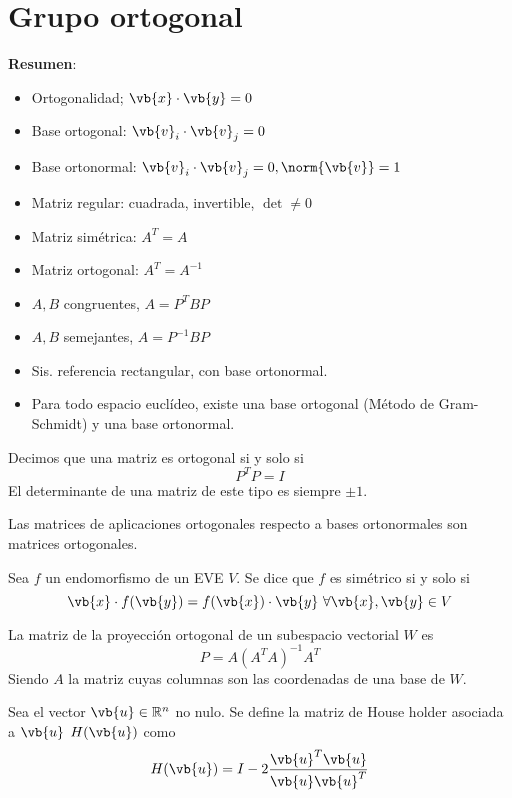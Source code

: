 \documentclass{./Geometria.tex}
\begin{document}
\chapter{Grupo ortogonal}
\textbf{Resumen}:
\begin{itemize}
    \item Ortogonalidad; \(\vb{x} \cdot \vb{y} = 0\)
    \item Base ortogonal: \(\vb{v}_i \cdot \vb{v}_j = 0\)
    \item Base ortonormal: \(\vb{v}_i \cdot \vb{v}_j = 0, \norm{\vb{v}} = 1\)
    \item Matriz regular: cuadrada, invertible, \(\det \neq 0\)
    \item Matriz simétrica: \(A^{T} = A\)
    \item Matriz ortogonal: \(A^{T} = A^{-1}\)
    \item \(A,B\) congruentes, \(A = P^{T}BP\)
    \item \(A,B\) semejantes, \(A = P^{-1}BP\)
    \item Sis. referencia rectangular, con base ortonormal.
    \item Para todo espacio euclídeo, existe una base ortogonal (Método de Gram-Schmidt) y una base ortonormal.
\end{itemize}
\begin{defin}
    Decimos que una matriz es ortogonal si y solo si
    \[
        P^{T}P = I
    \]
    El determinante de una matriz de este tipo es siempre \(\pm 1\).
\end{defin}
\begin{teorema}
    Las matrices de aplicaciones ortogonales respecto a bases ortonormales son matrices
    ortogonales.
\end{teorema}
\begin{defin}
    Sea \(f\) un endomorfismo de un EVE \(V\). Se dice que \(f\) es simétrico si y solo si
    \[
        \vb{x} \cdot f(\vb{y}) = f(\vb{x})\cdot \vb{y}~ \forall \vb{x}, \vb{y} \in V
    \]
\end{defin}
\begin{defin}
    La matriz de la proyección ortogonal de un subespacio vectorial \(W\) es
    \[
        P = A(A^{T}A)^{-1}A^{T}
    \]
    Siendo \(A\) la matriz cuyas columnas son las coordenadas de una base de \(W\).
\end{defin}
\begin{defin}
    Sea el vector \(\vb{u} \in \mathbb{R}^{n}\) no nulo. Se define la matriz
    de House holder asociada a \(\vb{u}\) \(H(\vb{u})\) como
    \[
        H(\vb{u}) = I - 2 \frac{\vb{u}^{T} \vb{u}}{\vb{u} \vb{u}^{T}}
    \]
\end{defin}
\end{document}
